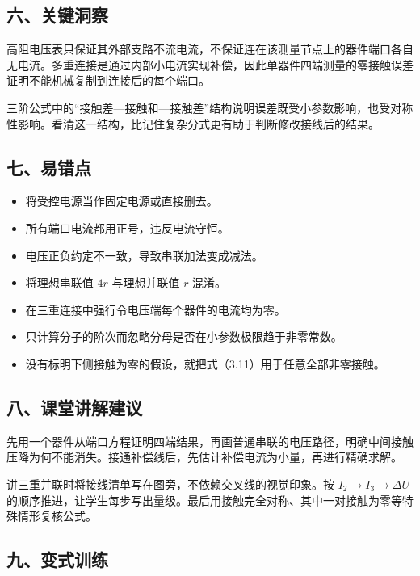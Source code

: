 \documentclass[12pt,a4paper,fontset=fandol]{ctexart}
\providecommand{\tightlist}{\setlength{\itemsep}{0pt}\setlength{\parskip}{0pt}}
\begin{document}
\subsection{六、关键洞察}\label{ux516dux5173ux952eux6d1eux5bdf-2}

高阻电压表只保证其外部支路不流电流，不保证连在该测量节点上的器件端口各自无电流。多重连接是通过内部小电流实现补偿，因此单器件四端测量的零接触误差证明不能机械复制到连接后的每个端口。

三阶公式中的``接触差---接触和---接触差''结构说明误差既受小参数影响，也受对称性影响。看清这一结构，比记住复杂分式更有助于判断修改接线后的结果。

\subsection{七、易错点}\label{ux4e03ux6613ux9519ux70b9-2}

\begin{itemize}
\tightlist
\item
  将受控电源当作固定电源或直接删去。
\item
  所有端口电流都用正号，违反电流守恒。
\item
  电压正负约定不一致，导致串联加法变成减法。
\item
  将理想串联值 \(4r\) 与理想并联值 \(r\) 混淆。
\item
  在三重连接中强行令电压端每个器件的电流均为零。
\item
  只计算分子的阶次而忽略分母是否在小参数极限趋于非零常数。
\item
  没有标明下侧接触为零的假设，就把式（3.11）用于任意全部非零接触。
\end{itemize}

\subsection{八、课堂讲解建议}\label{ux516bux8bfeux5802ux8bb2ux89e3ux5efaux8bae-2}

先用一个器件从端口方程证明四端结果，再画普通串联的电压路径，明确中间接触压降为何不能消失。接通补偿线后，先估计补偿电流为小量，再进行精确求解。

讲三重并联时将接线清单写在图旁，不依赖交叉线的视觉印象。按
\(I_2\to I_3\to \Delta U\)
的顺序推进，让学生每步写出量级。最后用接触完全对称、其中一对接触为零等特殊情形复核公式。

\subsection{九、变式训练}\label{ux4e5dux53d8ux5f0fux8badux7ec3-2}
\end{document}
